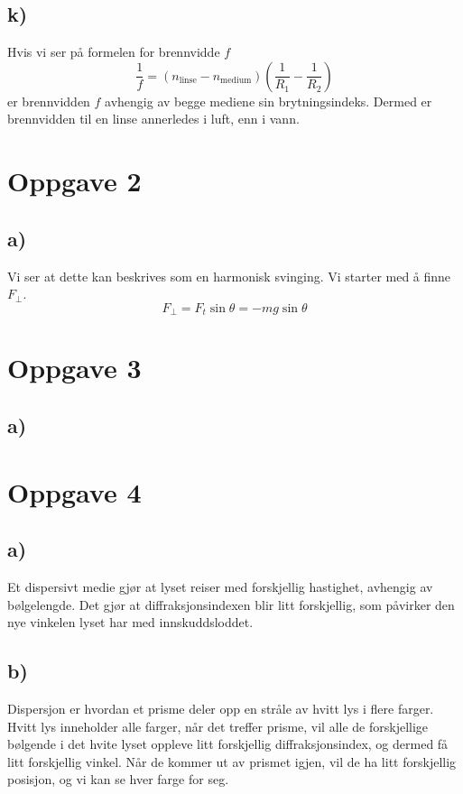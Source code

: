 \documentclass{article}
\begin{document}
  \subsection*{k)}
    Hvis vi ser på formelen for brennvidde $f$
    \[
    \frac{1}{f} = (n_{\text{linse}} -n_{\text{medium}}) \left(\frac{1}{R_1} - \frac{1}{R_2}\right)
    \]
    er brennvidden $f$ avhengig av begge mediene sin brytningsindeks. Dermed er brennvidden til en linse annerledes i luft, enn i vann.  
    

\section*{Oppgave 2}
  \subsection*{a)}
    Vi ser at dette kan beskrives som en harmonisk svinging. Vi starter med å finne $F_{\perp}$. 
    \[
    F_{\perp} = F_t \sin θ = -mg \sin θ
    \]
    

\section*{Oppgave 3}
  \subsection*{a)}


\section*{Oppgave 4}
  \subsection*{a)}
    Et dispersivt medie gjør at lyset reiser med forskjellig hastighet, avhengig av bølgelengde. Det gjør at diffraksjonsindexen blir litt forskjellig, som påvirker den nye vinkelen lyset har med innskuddsloddet. 
    
  \subsection*{b)}
    Dispersjon er hvordan et prisme deler opp en stråle av hvitt lys i flere farger. Hvitt lys inneholder alle farger, når det treffer prisme, vil alle de forskjellige bølgende i det hvite lyset oppleve litt forskjellig diffraksjonsindex, og dermed få litt forskjellig vinkel. Når de kommer ut av prismet igjen, vil de ha litt forskjellig posisjon, og vi kan se hver farge for seg. 
    
\end{document}
